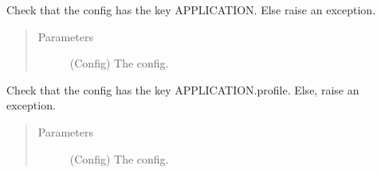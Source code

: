 \documentclass[a4paper,10pt,english]{sphinxmanual}
\begin{document}
\begin{fulllineitems}
\label{\detokenize{apidoc_src/src:src.utilsSat.check_config_has_application}}
Check that the config has the key APPLICATION. 
Else raise an exception.
\begin{quote}\begin{description}
\item[{Parameters}] \leavevmode
{} \textendash{} (Config) The config.

\end{description}\end{quote}

\end{fulllineitems}


\begin{fulllineitems}
\label{\detokenize{apidoc_src/src:src.utilsSat.check_config_has_profile}}
Check that the config has the key APPLICATION.profile.
Else, raise an exception.
\begin{quote}\begin{description}
\item[{Parameters}] \leavevmode
{} \textendash{} (Config) The config.

\end{description}\end{quote}

\end{fulllineitems}

\end{document}
